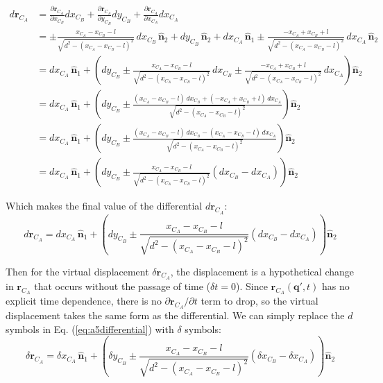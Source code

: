 \documentclass[titlepage]{article}
\begin{document}
\begin{equation}
	\begin{split}
		d\boldsymbol{r}_{C_A}&=\frac{\partial\boldsymbol{r}_{C_A}}{\partial x_{C_B} }dx_{C_B}+\frac{\partial\boldsymbol{r}_{C_A}}{\partial y_{C_B}}dy_{C_B}+\frac{\partial\boldsymbol{r}_{C_A}}{\partial x_{C_A}}dx_{C_A} \\
		&=\pm\frac{x_{C_A}-x_{C_B}-l}{\sqrt{d^2-(x_{C_A}-x_{C_B}-l)^2}}\,dx_{C_B}\,\hat{\boldsymbol{n}}_2+dy_{C_B}\,\hat{\boldsymbol{n}}_2+dx_{C_A}\,\hat{\boldsymbol{n}}_1\pm\frac{-x_{C_A}+x_{C_B}+l}{\sqrt{d^2-(x_{C_A}-x_{C_B}-l)^2}}\,dx_{C_A}\,\hat{\boldsymbol{n}}_2 \\
		&=dx_{C_A}\,\hat{\boldsymbol{n}}_1+\left(dy_{C_B}\pm\frac{x_{C_A}-x_{C_B}-l}{\sqrt{d^2-(x_{C_A}-x_{C_B}-l)^2}}\,dx_{C_B}\pm\frac{-x_{C_A}+x_{C_B}+l}{\sqrt{d^2-(x_{C_A}-x_{C_B}-l)^2}}\,dx_{C_A}\right)\hat{\boldsymbol{n}}_2 \\
		&=dx_{C_A}\,\hat{\boldsymbol{n}}_1+\left(dy_{C_B}\pm\frac{(x_{C_A}-x_{C_B}-l)\,dx_{C_B}+(-x_{C_A}+x_{C_B}+l)\,dx_{C_A}}{\sqrt{d^2-(x_{C_A}-x_{C_B}-l)^2}}\right)\hat{\boldsymbol{n}}_2 \\
		&=dx_{C_A}\,\hat{\boldsymbol{n}}_1+\left(dy_{C_B}\pm\frac{(x_{C_A}-x_{C_B}-l)\,dx_{C_B}-(x_{C_A}-x_{C_B}-l)\,dx_{C_A}}{\sqrt{d^2-(x_{C_A}-x_{C_B}-l)^2}}\right)\hat{\boldsymbol{n}}_2 \\
		&=dx_{C_A}\,\hat{\boldsymbol{n}}_1+\left(dy_{C_B}\pm\frac{x_{C_A}-x_{C_B}-l}{\sqrt{d^2-(x_{C_A}-x_{C_B}-l)^2}}\left(dx_{C_B}-dx_{C_A}\right)\right)\hat{\boldsymbol{n}}_2
	\end{split}
\end{equation}
\normalsize
\begin{mdframed}[linewidth=1pt, innertopmargin=10pt, innerbottommargin=10pt]
	Which makes the final value of the differential $d\boldsymbol{r}_{C_A}$:
	\begin{equation}
		d\boldsymbol{r}_{C_A}=dx_{C_A}\,\hat{\boldsymbol{n}}_1+\left(dy_{C_B}\pm\frac{x_{C_A}-x_{C_B}-l}{\sqrt{d^2-(x_{C_A}-x_{C_B}-l)^2}}\left(dx_{C_B}-dx_{C_A}\right)\right)\hat{\boldsymbol{n}}_2
		\label{eq:a5differential}
	\end{equation} 
\end{mdframed}
\begin{mdframed}[linewidth=1pt, innertopmargin=10pt, innerbottommargin=10pt]
		Then for the virtual displacement $\delta\boldsymbol{r}_{C_A}$, the displacement is a hypothetical change in $\boldsymbol{r}_{C_A}$ that occurs without the passage of time ($\delta t=0$). Since $\boldsymbol{r}_{C_A}(\boldsymbol{q}',t)$ has no explicit time dependence, there is no $\partial\boldsymbol{r}_{C_A}/\partial t$ term to drop, so the virtual displacement takes the same form as the differential. We can simply replace the $d$ symbols in Eq. (\ref{eq:a5differential}) with $\delta$ symbols:
	\begin{equation}
		\delta\boldsymbol{r}_{C_A}=\delta x_{C_A}\,\hat{\boldsymbol{n}}_1+\left(\delta y_{C_B}\pm\frac{x_{C_A}-x_{C_B}-l}{\sqrt{d^2-(x_{C_A}-x_{C_B}-l)^2}}\left(\delta x_{C_B}-\delta x_{C_A}\right)\right)\hat{\boldsymbol{n}}_2
	\end{equation} 
\end{mdframed}
\end{document}
